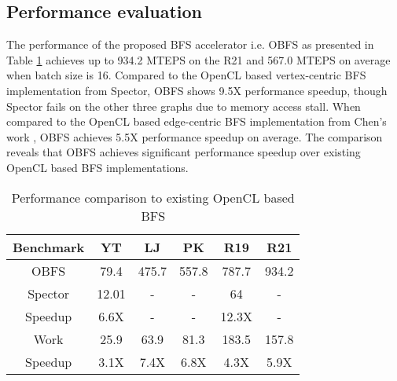 \subsection{Performance evaluation}
The performance of the proposed BFS accelerator i.e. OBFS 
as presented in Table \ref{tab:performance-summary} achieves 
up to 934.2 MTEPS on the R21 and 567.0 MTEPS on average 
when batch size is 16. 
Compared to the OpenCL based vertex-centric BFS 
implementation from Spector, OBFS shows 9.5X performance 
speedup, though Spector fails on the other three graphs 
due to memory access stall. 
When compared to the OpenCL based edge-centric BFS 
implementation from Chen's work \cite{chen_fpl2019}, 
OBFS achieves 5.5X performance speedup on average. 
The comparison reveals that OBFS achieves significant 
performance speedup over existing OpenCL based BFS 
implementations. 

\begin{table}
    \centering
  \caption{Performance comparison to existing OpenCL based BFS}
  \label{tab:performance-summary}
  \begin{tabular}{cccccc}
    \toprule
    Benchmark & YT & LJ & PK & R19 & R21\\
    \midrule
	OBFS & 79.4 & 475.7 & 557.8 & 787.7 & 934.2 \\
	\midrule
	Spector & 12.01 & - & - & 64 & -\\
    Speedup & 6.6X & - & - & 12.3X & - \\
	\midrule
	Work\cite{chen_fpl2019} & 25.9 & 63.9 & 81.3 & 183.5 & 157.8 \\
    Speedup & 3.1X & 7.4X & 6.8X & 4.3X & 5.9X \\
  \bottomrule
\end{tabular}
\vspace{-0.5em}
\end{table}


